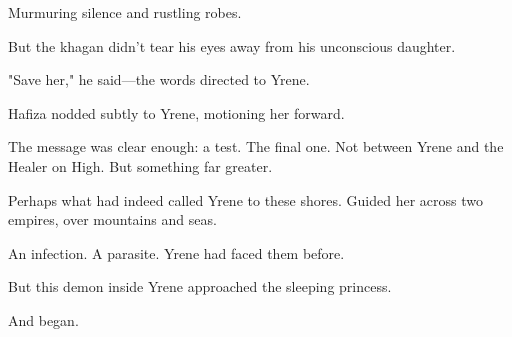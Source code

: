 Murmuring silence and rustling robes.

But the khagan didn't tear his eyes away from his unconscious daughter.

"Save her," he said---the words directed to Yrene.

Hafiza nodded subtly to Yrene, motioning her forward.

The message was clear enough: a test. The final one. Not between Yrene and the Healer on High. But something far greater.

Perhaps what had indeed called Yrene to these shores. Guided her across two empires, over mountains and seas.

An infection. A parasite. Yrene had faced them before.

But this demon inside  Yrene approached the sleeping princess.

And began.

